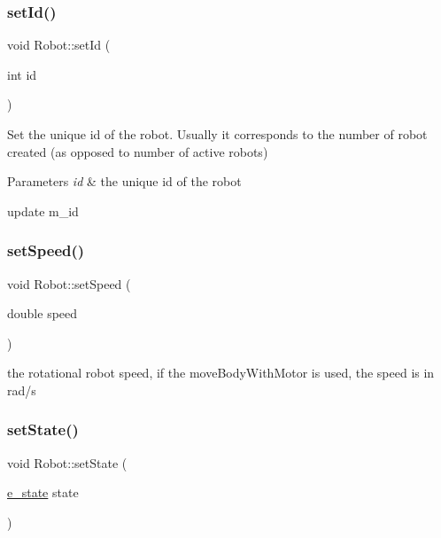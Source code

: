 \subsubsection{\texorpdfstring{set\+Id()}{setId()}}
{\footnotesize\ttfamily void Robot\+::set\+Id (\begin{DoxyParamCaption}\item[{int}]{id }\end{DoxyParamCaption})}

Set the unique id of the robot. Usually it corresponds to the number of robot created (as opposed to number of active robots) 
\begin{DoxyParams}{Parameters}
{\em id} & the unique id of the robot\\
\hline
\end{DoxyParams}
update m\+\_\+id \mbox{\label{class_robot_a0a1948c69efd8bce2487afdedb6f47f1}} 
\subsubsection{\texorpdfstring{set\+Speed()}{setSpeed()}}
{\footnotesize\ttfamily void Robot\+::set\+Speed (\begin{DoxyParamCaption}\item[{double}]{speed }\end{DoxyParamCaption})}

the rotational robot speed, if the move\+Body\+With\+Motor is used, the speed is in rad/s \mbox{\label{class_robot_aaf534f168d818112ae1f6440b329eb0a}} 
\subsubsection{\texorpdfstring{set\+State()}{setState()}}
{\footnotesize\ttfamily void Robot\+::set\+State (\begin{DoxyParamCaption}\item[{\mbox{\hyperlink{_robot_8h_a74a75e4700f1f71bb89d80765319e57b}{e\+\_\+state}}}]{state }\end{DoxyParamCaption})}

